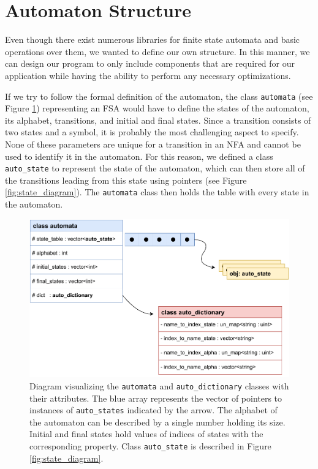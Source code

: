 \section{Automaton Structure}
Even though there exist numerous libraries for finite state automata and basic operations over them, we wanted to define our own structure. In this manner, we can design our program to only include components that are required for our application while having the ability to perform any necessary optimizations. 

If we try to follow the formal definition of the automaton, the class \verb|automata| (see Figure \ref{fig:automata_diagram}) representing an FSA would have to define the states of the automaton, its alphabet, transitions, and initial and final states. Since a transition consists of two states and a symbol, it is probably the most challenging aspect to specify. None of these parameters are unique for a transition in an NFA and cannot be used to identify it in the automaton. For this reason, we defined a class \verb|auto_state| to represent the state of the automaton, which can then store all of the transitions leading from this state using pointers (see Figure \ref{fig:state_diagram}). The \verb|automata| class then holds the table with every state in the automaton.

\begin{figure}[ht]
    \label{fig:automata_diagram}
    \centering
    \includegraphics[width=0.9\linewidth]{obrazky-figures/automata_class.pdf}
    \caption{Diagram visualizing the \texttt{automata} and \texttt{auto\_dictionary} classes with their attributes. The blue array represents the vector of pointers to instances of \texttt{auto\_states} indicated by the arrow. The alphabet of the automaton can be described by a single number holding its size. Initial and final states hold values of indices of states with the corresponding property. Class \texttt{auto\_state} is described in Figure \ref{fig:state_diagram}.}
\end{figure}
\vspace{0.3cm}

